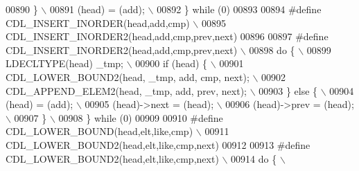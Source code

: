 \begin{DoxyCode}
00890 \textcolor{preprocessor}{ \}                                                                                             \(\backslash\)}
00891 \textcolor{preprocessor}{ (head) = (add);                                                                               \(\backslash\)}
00892 \textcolor{preprocessor}{\} while (0)}
00893 
00894 \textcolor{preprocessor}{#define CDL\_INSERT\_INORDER(head,add,cmp)                                                       \(\backslash\)}
00895 \textcolor{preprocessor}{    CDL\_INSERT\_INORDER2(head,add,cmp,prev,next)}
00896 
00897 \textcolor{preprocessor}{#define CDL\_INSERT\_INORDER2(head,add,cmp,prev,next)                                            \(\backslash\)}
00898 \textcolor{preprocessor}{do \{                                                                                           \(\backslash\)}
00899 \textcolor{preprocessor}{  LDECLTYPE(head) \_tmp;                                                                        \(\backslash\)}
00900 \textcolor{preprocessor}{  if (head) \{                                                                                  \(\backslash\)}
00901 \textcolor{preprocessor}{    CDL\_LOWER\_BOUND2(head, \_tmp, add, cmp, next);                                              \(\backslash\)}
00902 \textcolor{preprocessor}{    CDL\_APPEND\_ELEM2(head, \_tmp, add, prev, next);                                             \(\backslash\)}
00903 \textcolor{preprocessor}{  \} else \{                                                                                     \(\backslash\)}
00904 \textcolor{preprocessor}{    (head) = (add);                                                                            \(\backslash\)}
00905 \textcolor{preprocessor}{    (head)->next = (head);                                                                     \(\backslash\)}
00906 \textcolor{preprocessor}{    (head)->prev = (head);                                                                     \(\backslash\)}
00907 \textcolor{preprocessor}{  \}                                                                                            \(\backslash\)}
00908 \textcolor{preprocessor}{\} while (0)}
00909 
00910 \textcolor{preprocessor}{#define CDL\_LOWER\_BOUND(head,elt,like,cmp)                                                     \(\backslash\)}
00911 \textcolor{preprocessor}{    CDL\_LOWER\_BOUND2(head,elt,like,cmp,next)}
00912 
00913 \textcolor{preprocessor}{#define CDL\_LOWER\_BOUND2(head,elt,like,cmp,next)                                               \(\backslash\)}
00914 \textcolor{preprocessor}{do \{                                                                                           \(\backslash\)}

\end{DoxyCode}
